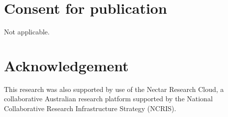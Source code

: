 \documentclass[twocolumn,hyperref]{bmcart}\pdfoutput=1
\begin{document}
\begin{backmatter}
\section*{Consent for publication}
Not applicable.

\section*{Acknowledgement}
This research was also supported by use of the Nectar Research Cloud, a collaborative Australian research platform supported by the National Collaborative Research Infrastructure Strategy (NCRIS).




       







\end{backmatter}
\end{document}
